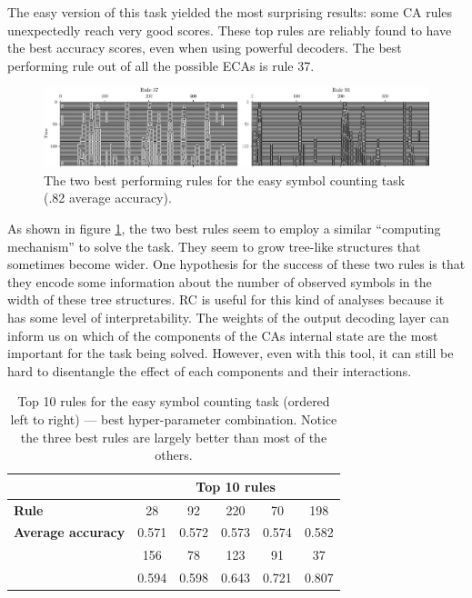 The easy version of this task yielded the most surprising results: some CA rules
unexpectedly reach very good scores. These top rules are reliably found to have
the best accuracy scores, even when using powerful decoders. The best performing
rule out of all the possible \acp{ECA} is rule 37.

\begin{figure}[htbp]
  \centering
  \includegraphics[width=\linewidth]{figures/rules-sym-ct.pdf}
  \caption{The two best performing rules for the easy symbol counting task (.82
    average accuracy).}\label{fig:best_sym_ct}
\end{figure}

As shown in figure \ref{fig:best_sym_ct}, the two best rules seem to employ a
similar ``computing mechanism'' to solve the task. They seem to grow tree-like
structures that sometimes become wider. One hypothesis for the success of these
two rules is that they encode some information about the number of observed
symbols in the width of these tree structures. \ac{RC} is useful for this kind
of analyses because it has some level of interpretability. The weights of the
output decoding layer can inform us on which of the components of the \acp{CA}
internal state are the most important for the task being solved. However, even
with this tool, it can still be hard to disentangle the effect of each
components and their interactions.

\begin{table}[htbp]
  \centering
    \begin{tabular}{p{4cm}ccccc}
      \toprule
      & \multicolumn{5}{c}{\bfseries Top 10 rules}\\
      \midrule
      \bfseries Rule & 28 & 92 & 220 & 70 & 198\\
      \bfseries Average accuracy & 0.571 & 0.572 & 0.573 & 0.574 & 0.582 \\
      \midrule
      \hrulefill & 156 & 78 & 123 & 91 & 37\\
      \hrulefill & 0.594 & 0.598 & 0.643 & 0.721 & 0.807\\
      \bottomrule
    \end{tabular}
  \caption{Top 10 rules for the easy symbol counting task (ordered left to
    right) --- best hyper-parameter combination. Notice the three best rules are
    largely better than most of the others.}\label{tab:top_sym_ct_rules}
\end{table}



